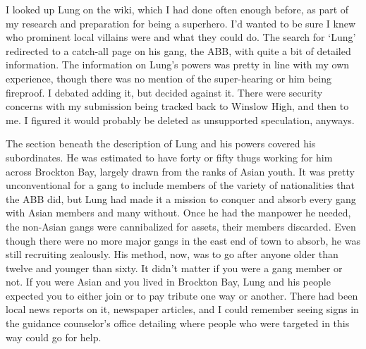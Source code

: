 I looked up Lung on the wiki, which I had done often enough before, as part of my research and preparation for being a superhero.  I'd wanted to be sure I knew who prominent local villains were and what they could do.  The search for `Lung' redirected to a catch-all page on his gang, the ABB, with quite a bit of detailed information.  The information on Lung's powers was pretty in line with my own experience, though there was no mention of the super-hearing or him being fireproof.  I debated adding it, but decided against it.  There were security concerns with my submission being tracked back to Winslow High, and then to me.  I figured it would probably be deleted as unsupported speculation, anyways.



The section beneath the description of Lung and his powers covered his subordinates.  He was estimated to have forty or fifty thugs working for him across Brockton Bay, largely drawn from the ranks of Asian youth.  It was pretty unconventional for a gang to include members of the variety of nationalities that the ABB did, but Lung had made it a mission to conquer and absorb every gang with Asian members and many without.  Once he had the manpower he needed, the non-Asian gangs were cannibalized for assets, their members discarded.  Even though there were no more major gangs in the east end of town to absorb, he was still recruiting zealously.  His method, now, was to go after anyone older than twelve and younger than sixty.  It didn't matter if you were a gang member or not.  If you were Asian and you lived in Brockton Bay, Lung and his people expected you to either join or to pay tribute one way or another.  There had been local news reports on it, newspaper articles, and I could remember seeing signs in the guidance counselor's office detailing where people who were targeted in this way could go for help.



